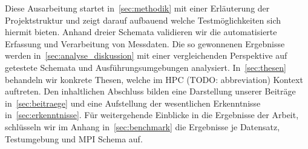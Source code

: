 Diese Ausarbeitung startet in~\ref{sec:methodik} mit einer Erläuterung der Projektstruktur und zeigt darauf aufbauend welche Testmöglichkeiten sich hiermit bieten. Anhand dreier Schemata validieren wir die automatisierte Erfassung und Verarbeitung von Messdaten. Die so gewonnenen Ergebnisse werden in~\ref{sec:analyse_diskussion} mit einer vergleichenden Perspektive auf getestete Schemata und Ausführungsumgebungen analysiert. In~\ref{sec:thesen} behandeln wir konkrete Thesen, welche im HPC (TODO: abbreviation) Kontext auftreten.
Den inhaltlichen Abschluss bilden eine Darstellung unserer Beiträge in~\ref{sec:beitraege} und eine Aufstellung der wesentlichen Erkenntnisse in~\ref{sec:erkenntnisse}. Für weitergehende Einblicke in die Ergebnisse der Arbeit, schlüsseln wir im Anhang in~\ref{sec:benchmark} die Ergebnisse je Datensatz, Testumgebung und MPI Schema auf.
